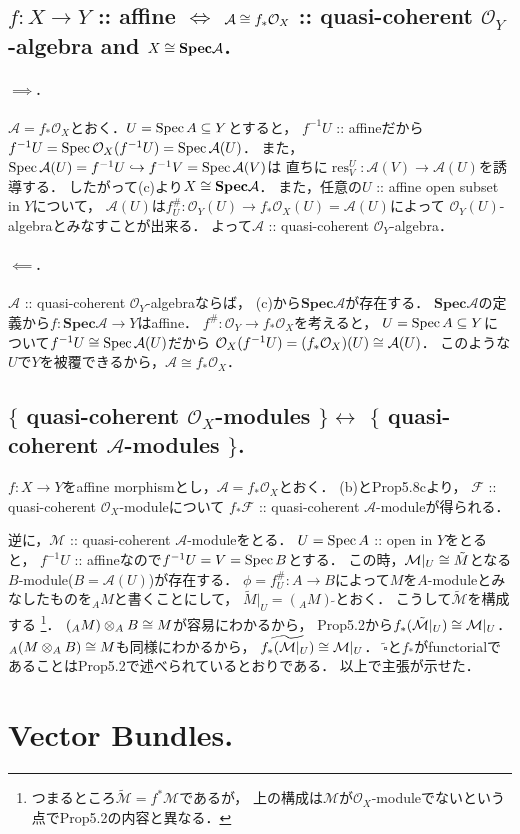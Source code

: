 \documentclass[a4paper]{jsarticle}
\newcommand{\shA}{\mathcal{A}}
\newcommand{\shF}{\mathcal{F}}
\newcommand{\shO}{\mathcal{O}}
\newcommand{\shM}{\mathcal{M}}
\newcommand{\res}{\operatorname{res}}
\newcommand{\bfSpec}{\mathbf{Spec}}
\newcommand{\sidetilde}{\,\tilde{}}
\begin{document}
    \subsection{$f: X \to Y$ :: affine $\iff$
        $\shA \iso f_* \shO_X$ :: quasi-coherent $\shO_Y$-algebra and $X \iso \bfSpec \shA$.}

    \paragraph{$\implies$.}
    $\shA=f_* \shO_X$とおく．$U=\operatorname{Spec} A \subseteq Y$とすると，
    $f^{-1}U$ :: affineだから$f^{-1}U=\Spec \shO_X(f^{-1}U)=\Spec \shA(U)$．
    また，$\Spec \shA(U)=f^{-1}U \hookrightarrow f^{-1}V=\Spec \shA(V)$は
    直ちに$\res_V^U: \shA(V) \to \shA(U)$を誘導する．
    したがって(c)より$X \iso \bfSpec \shA$．
    また，任意の$U$ :: affine open subset in $Y$について，
    $\shA(U)$は$f^{\#}_U: \shO_Y(U) \to f_*\shO_X(U)=\shA(U)$によって
    $\shO_Y(U)$-algebraとみなすことが出来る．
    よって$\shA$ :: quasi-coherent $\shO_Y$-algebra．

    \paragraph{$\impliedby$.}
    $\shA$ :: quasi-coherent $\shO_Y$-algebraならば，
    (c)から$\bfSpec \shA$が存在する．
    $\bfSpec \shA$の定義から$f: \bfSpec \shA \to Y$はaffine．
    $f^{\#}: \shO_Y \to f_*\shO_X$を考えると，
    $U=\operatorname{Spec} A \subseteq Y$について$f^{-1}U \iso \Spec \shA(U)$だから
    $\shO_X(f^{-1}U)=(f_*\shO_X)(U) \iso \shA(U)$．
    このような$U$で$Y$を被覆できるから，$\shA \cong f_*\shO_X$．

    \subsection{$\{$ quasi-coherent $\shO_X$-modules $\} \leftrightarrow$ $\{$ quasi-coherent $\shA$-modules $\}$.}
    $f: X \to Y$をaffine morphismとし，$\shA=f_*\shO_X$とおく．
    (b)とProp5.8cより，
    $\shF$ :: quasi-coherent $\shO_X$-moduleについて
    $f_* \shF$ :: quasi-coherent $\shA$-moduleが得られる．

    逆に，$\shM$ :: quasi-coherent $\shA$-moduleをとる．
    $U=\operatorname{Spec} A$ :: open in $Y$をとると，
    $f^{-1}U$ :: affineなので$f^{-1}U=V=\operatorname{Spec} B$とする．
    この時，$\shM|_U \iso \tilde{M}$となる$B$-module($B=\shA(U)$)が存在する．
    $\phi=f^{\#}_U: A \to B$によって$M$を$A$-moduleとみなしたものを${}_A M$と書くことにして，
    $\tilde{M}|_U=({}_A M)\sidetilde$とおく．
    こうして$\tilde{\shM}$を構成する
    \footnote
    {
        つまるところ$\tilde{\shM}=f^* \shM$であるが，
        上の構成は$\shM$が$\shO_X$-moduleでないという点でProp5.2の内容と異なる．
    }．
    $({}_A M) \otimes_A B \cong M$が容易にわかるから，
    Prop5.2から$f_*(\tilde{\shM}|_U) \iso \shM|_U$．
    ${}_A(M \otimes_A B) \cong M$も同様にわかるから，
    $\widetilde{f_*(\shM|_U)} \iso \shM|_U$．
    $\tilde{\square}$と$f_*$がfunctorialであることはProp5.2で述べられているとおりである．
    以上で主張が示せた．

\section{Vector Bundles.} %
\end{document}
